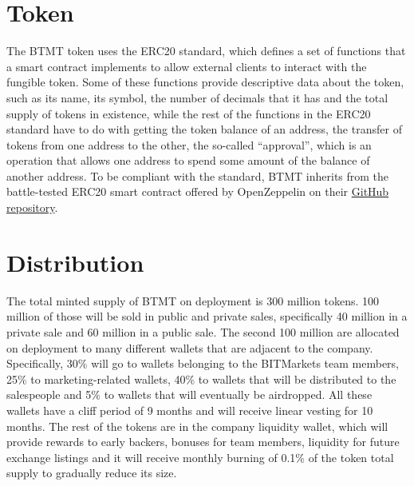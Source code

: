 \documentclass[a4paper,12pt]{article}
\begin{document}
\section{Token}

The BTMT token uses the ERC20 standard, which defines a set of functions that a smart contract implements to allow external clients to interact with the fungible
token. Some of these functions provide descriptive data about the token, such as its name, its symbol, the number of decimals that it has and the total supply of tokens in existence, while the rest of the functions in the ERC20 standard have to do with getting the token balance of an address,
the transfer of tokens from one address to the other,
the so-called ``approval'', which is an operation that allows one address to spend some amount of the balance of another address. To be compliant with the standard, BTMT inherits from the battle-tested ERC20 smart contract offered by OpenZeppelin on their \href{https://github.com/OpenZeppelin/openzeppelin-contracts/blob/master/contracts/token/ERC20/ERC20.sol}{GitHub repository}.

\section{Distribution}
The total minted supply of BTMT on deployment is 300 million tokens.
100 million of those will be sold in public and private sales, specifically 40 million in a private sale and 60 million in a public sale.
The second 100 million are allocated on deployment to many different wallets that are adjacent to the company. Specifically, 30\% will go to wallets belonging to the BITMarkets team members, 25\% to marketing-related wallets, 40\% to wallets that will be distributed to the salespeople and 5\% to wallets that will eventually be airdropped. All these wallets have a cliff period of 9 months and will receive linear vesting for 10 months. The rest of the tokens are in the company liquidity wallet, which will provide rewards to early backers, bonuses for team members, liquidity for future exchange listings and it will receive monthly burning of 0.1\% of the token total supply to gradually reduce its size. %
\end{document}

